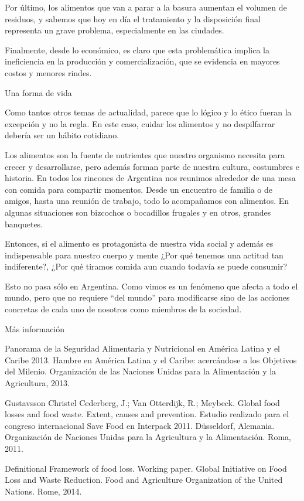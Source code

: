 Por último, los alimentos que van a parar a la basura aumentan el
volumen de residuos, y sabemos que hoy en día el tratamiento y la
disposición final representa un grave problema, especialmente en las
ciudades.

Finalmente, desde lo económico, es claro que esta problemática implica
la ineficiencia en la producción y comercialización, que se evidencia en
mayores costos y menores rindes.

Una forma de vida

Como tantos otros temas de actualidad, parece que lo lógico y lo ético
fueran la excepción y no la regla. En este caso, cuidar los alimentos y
no despilfarrar debería ser un hábito cotidiano.

Los alimentos son la fuente de nutrientes que nuestro organismo necesita
para crecer y desarrollarse, pero además forman parte de nuestra
cultura, costumbres e historia. En todos los rincones de Argentina nos
reunimos alrededor de una mesa con comida para compartir momentos. Desde
un encuentro de familia o de amigos, hasta una reunión de trabajo, todo
lo acompañamos con alimentos. En algunas situaciones son bizcochos o
bocadillos frugales y en otros, grandes banquetes.

Entonces, si el alimento es protagonista de nuestra vida social y además
es indispensable para nuestro cuerpo y mente ¿Por qué tenemos una
actitud tan indiferente?, ¿Por qué tiramos comida aun cuando todavía se
puede consumir?

Esto no pasa sólo en Argentina. Como vimos es un fenómeno que afecta a
todo el mundo, pero que no requiere ``del mundo'' para modificarse sino
de las acciones concretas de cada uno de nosotros como miembros de la
sociedad.

Más información

Panorama de la Seguridad Alimentaria y Nutricional en América Latina y
el Caribe 2013. Hambre en América Latina y el Caribe: acercándose a los
Objetivos del Milenio. Organización de las Naciones Unidas para la
Alimentación y la Agricultura, 2013.

Gustavsson Christel Cederberg, J.; Van Otterdijk, R.; Meybeck. Global
food losses and food waste. Extent, causes and prevention. Estudio
realizado para el congreso internacional Save Food en Interpack 2011.
Düsseldorf, Alemania. Organización de Naciones Unidas para la
Agricultura y la Alimentación. Roma, 2011.

Definitional Framework of food loss. Working paper. Global Initiative on
Food Loss and Waste Reduction. Food and Agriculture Organization of the
United Nations. Rome, 2014.

